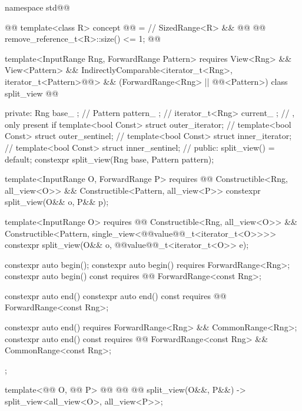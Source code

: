 \begin{codeblock}
namespace std@@ { @@
  template<class R>
  concept @@ = // \expos
    SizedRange<R> && @@
      @@ remove_reference_t<R>::size() <= 1;
    @\oldtxt{\};}@

  template<InputRange Rng, ForwardRange Pattern>
    requires View<Rng> && View<Pattern> &&
      IndirectlyComparable<iterator_t<Rng>, iterator_t<Pattern>@@> &&
      (ForwardRange<Rng> || @@<Pattern>)
  class split_view @@ {
  private:
    Rng base_ {};                               // \expos
    Pattern pattern_ {};                        // \expos
    iterator_t<Rng> current_ {};                // \expos, only present if 
    template<bool Const> struct outer_iterator; // \expos
    template<bool Const> struct outer_sentinel; // \expos
    template<bool Const> struct inner_iterator; // \expos
    template<bool Const> struct inner_sentinel; // \expos
  public:
    split_view() = default;
    constexpr split_view(Rng base, Pattern pattern);

    template<InputRange O, ForwardRange P>
      requires @@
        Constructible<Rng, all_view<O>> &&
        Constructible<Pattern, all_view<P>>
    constexpr split_view(O&& o, P&& p);

    template<InputRange O>
      requires @@
        Constructible<Rng, all_view<O>> &&
        Constructible<Pattern, single_view<@@value@@_t<iterator_t<O>>>>
    constexpr split_view(O&& o, @@value@@_t<iterator_t<O>> e);

    constexpr auto begin();
    constexpr auto begin() requires ForwardRange<Rng>;
    constexpr auto begin() const
      requires @@ ForwardRange<const Rng>;

    constexpr auto end()
    constexpr auto end() const
      requires @@ ForwardRange<const Rng>;

    constexpr auto end()
      requires ForwardRange<Rng> && CommonRange<Rng>;
    constexpr auto end() const
      requires @@ ForwardRange<const Rng> && CommonRange<const Rng>;
  };

  template<@@ O, @@ P>
    @@
      @@
      @@
  split_view(O&&, P&&) -> split_view<all_view<O>, all_view<P>>;

}
\end{codeblock}
